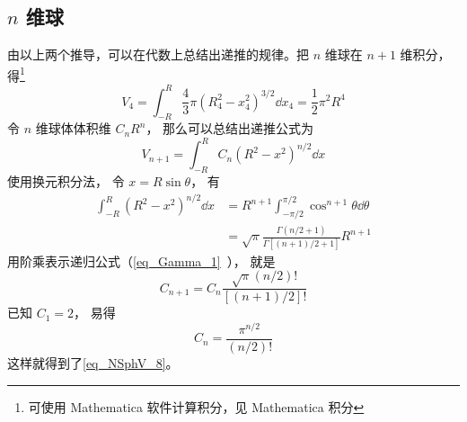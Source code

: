 \subsection{ $n$ 维球}
由以上两个推导，可以在代数上总结出递推的规律。把 $n$ 维球在 $n+1$ 维积分，得\footnote{可使用  Mathematica 软件计算积分，见 Mathematica 积分}%
\begin{equation}
V_4 = \int_{-R}^R \frac43 \pi (R_4^2 - x_4^2)^{3/2} \dd{x_4}  = \frac12 \pi^2 R^4
\end{equation}
令 $n$ 维球体体积维 $C_n R^n$， 那么可以总结出递推公式为
\begin{equation}
V_{n+1} = \int_{-R}^R C_n (R^2 - x^2)^{n/2}\dd{x}
\end{equation}
使用换元积分法， 令 $x = R\sin\theta$， 有
\begin{equation}
\begin{aligned}
\int_{-R}^R (R^2 - x^2)^{n/2}\dd{x} &= R^{n+1} \int_{-\pi/2}^{\pi/2} \cos^{n+1}\theta \dd{\theta}\\
&= \sqrt{\pi} \frac{\Gamma(n/2+1)}{\Gamma[(n+1)/2+1]} R^{n+1}
\end{aligned}
\end{equation}
用阶乘表示递归公式（\autoref{eq_Gamma_1}~）， 就是
\begin{equation}
C_{n+1} = C_n \frac{\sqrt{\pi}(n/2)!}{[(n+1)/2]!}
\end{equation}
已知 $C_1 = 2$， 易得
\begin{equation}
C_n = \frac{\pi^{n/2}}{(n/2)!}
\end{equation}
这样就得到了\autoref{eq_NSphV_8}。
